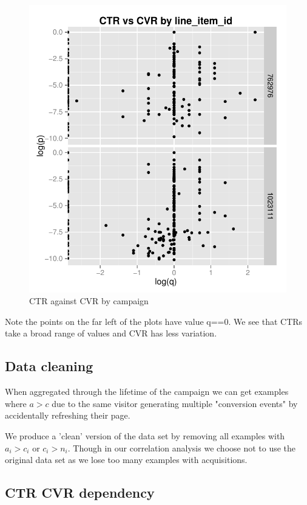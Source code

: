 \documentclass[11pt,a4,singlespacing,titlepagenumber=on]{scrreprt}
\numberwithin{equation}{chapter} %
\theoremstyle{remark}
\begin{document}
\begin{figure}[H]
    \centering
    \includegraphics{CTRvsCVR}
    \caption{CTR against CVR by campaign}
    \label{fig:CTRvsCVR}
\end{figure}


Note the points on the far left of the plots have value q==0.  We see that CTRs take a broad range of values and CVR has less variation. 

\subsection{Data cleaning}

When aggregated through the lifetime of the campaign we can get examples where $a>c$ due to the same visitor generating multiple "conversion events" by accidentally refreshing their page.

We produce a 'clean' version of the data set by removing all examples with $a_i > c_i$ or $c_i > n_i$. Though in our correlation analysis we choose not to use the original data set as we lose too many examples with acquisitions.

\subsection{CTR CVR dependency}
\end{document}
